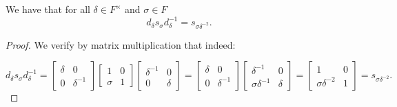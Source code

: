 \begin{lemma}
\label{SpecialMatrices.d_mul_s_mul_d_inv_eq_s}
\leanok
    We have that for all $\delta \in F^\times$ and $\sigma \in F$
    \[
    d_\delta s_\sigma d^{-1}_\delta = s_{\sigma \delta^{-2}}.
    \]
\end{lemma}
\begin{proof}
\leanok
    We verify by matrix multiplication that indeed:

    \begin{equation*}
        d_\delta s_\sigma d^{-1}_\delta = \! \begin{bmatrix} \delta & 0 \\ 0 & \delta^{-1} \end{bmatrix} \begin{bmatrix} 1 & 0 \\ \sigma & 1 \end{bmatrix} \begin{bmatrix} \delta^{-1} & 0 \\ 0 & \delta \end{bmatrix} = \begin{bmatrix} \delta & 0 \\ 0 & \delta^{-1} \end{bmatrix} \! \begin{bmatrix} \delta^{-1} & 0 \\ \sigma \delta^{-1} & \delta \end{bmatrix} \! = \! \begin{bmatrix} 1 & 0 \\ \sigma \delta^{-2} & 1 \end{bmatrix} \! = s_{\sigma \delta^{-2}}.
    \end{equation*}
\end{proof}




